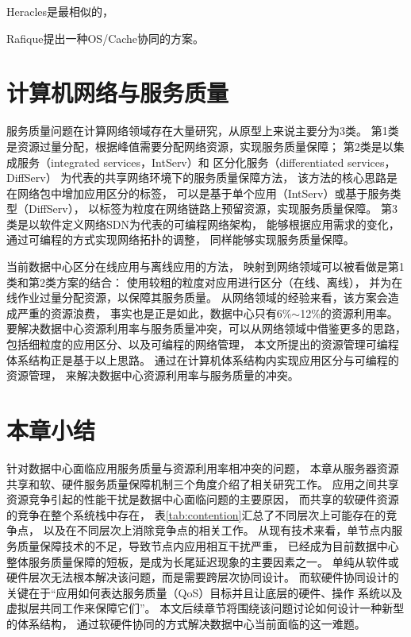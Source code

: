 Heracles是最相似的，

Rafique提出一种OS/Cache协同的方案。


\section{计算机网络与服务质量}
\label{sec:background:sdn}

服务质量问题在计算网络领域存在大量研究，从原型上来说主要分为3类。
第1类是资源过量分配，根据峰值需要分配网络资源，实现服务质量保障；
第2类是以集成服务（integrated services，IntServ）\cite{IntServ}和
区分化服务（differentiated services，DiffServ）\cite{DiffServ}
为代表的共享网络环境下的服务质量保障方法，
该方法的核心思路是在网络包中增加应用区分的标签，
可以是基于单个应用（IntServ）或基于服务类型（DiffServ），
以标签为粒度在网络链路上预留资源，实现服务质量保障。
第3类是以软件定义网络SDN\cite{SDN}为代表的可编程网络架构，
能够根据应用需求的变化，通过可编程的方式实现网络拓扑的调整，
同样能够实现服务质量保障。

当前数据中心区分在线应用与离线应用的方法，
映射到网络领域可以被看做是第1类和第2类方案的结合：
使用较粗的粒度对应用进行区分（在线、离线），
并为在线作业过量分配资源，以保障其服务质量。
从网络领域的经验来看，该方案会造成严重的资源浪费，
事实也是正是如此，数据中心只有6\%$\sim$12\%的资源利用率。
要解决数据中心资源利用率与服务质量冲突，可以从网络领域中借鉴更多的思路，
包括细粒度的应用区分、以及可编程的网络管理，
本文所提出的资源管理可编程体系结构正是基于以上思路。
通过在计算机体系结构内实现应用区分与可编程的资源管理，
来解决数据中心资源利用率与服务质量的冲突。



\section{本章小结}

针对数据中心面临应用服务质量与资源利用率相冲突的问题，
本章从服务器资源共享和软、硬件服务质量保障机制三个角度介绍了相关研究工作。
应用之间共享资源竞争引起的性能干扰是数据中心面临问题的主要原因，
而共享的软硬件资源的竞争在整个系统栈中存在，
表\ref{tab:contention}汇总了不同层次上可能存在的竞争点，
以及在不同层次上消除竞争点的相关工作。
从现有技术来看，单节点内服务质量保障技术的不足，导致节点内应用相互干扰严重，
已经成为目前数据中心整体服务质量保障的短板，是成为长尾延迟现象的主要因素之一。
单纯从软件或硬件层次无法根本解决该问题，而是需要跨层次协同设计。
而软硬件协同设计的关键在于``应用如何表达服务质量（QoS）目标并且让底层的硬件、操作
系统以及虚拟层共同工作来保障它们''\cite{21st_architecture}。
本文后续章节将围绕该问题讨论如何设计一种新型的体系结构，
通过软硬件协同的方式解决数据中心当前面临的这一难题。


